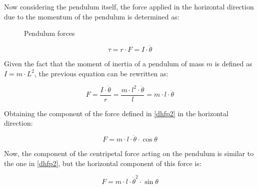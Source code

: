 Now considering the pendulum itself, the force applied in the horizontal direction due to the momentum of the pendulum is determined as:

\begin{figure}[h]
	\centering
	\caption{Pendulum forces}\label{fig:penforces}
\end{figure}

\begin{equation} \label{dhfp}
	\tau=r\cdot F=I\cdot \ddot{\theta}
\end{equation}

Given the fact that the moment of inertia of a pendulum of mass $m$ is defined as $I=m\cdot L^2$, the previous equation can be rewritten as:

\begin{equation} \label{dhfp2}
	F=\frac{I\cdot \ddot{\theta}}{r}=\frac{m\cdot l^2\cdot \ddot{\theta}}{l}=m\cdot l\cdot \ddot{\theta}
\end{equation}

Obtaining the component of the force defined in \ref{dhfp2} in the horizontal direction:

\begin{equation} \label{sfph}
	F=m\cdot l\cdot \ddot{\theta}\cdot \cos{\theta}
\end{equation}

Now, the component of the centripetal force acting on the pendulum is similar to the one in \ref{dhfp2}, but the horizontal component of this force is:

\begin{equation} \label{cfph}
	F=m\cdot l\cdot \dot{\theta}^2\cdot \sin{\theta}
\end{equation}

